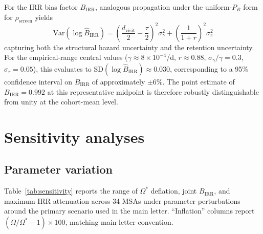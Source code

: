 \documentclass[11pt]{article}
\begin{document}
For the IRR bias factor $B_{\mathrm{IRR}}$, analogous propagation under the uniform-$P_R$ form for $\rho_{\mathrm{screen}}$ yields
\begin{equation}
\mathrm{Var}(\log \widehat{B}_{\mathrm{IRR}}) = \left(\frac{d_{\mathrm{visit}}}{2} - \frac{\tau}{2}\right)^2 \sigma_\gamma^2 + \left(\frac{1}{1+r}\right)^2 \sigma_r^2
\end{equation}
capturing both the structural hazard uncertainty and the retention uncertainty. For the empirical-range central values ($\gamma \approx 8\times10^{-4}$/d, $r \approx 0.88$, $\sigma_\gamma/\gamma = 0.3$, $\sigma_r = 0.05$), this evaluates to $\mathrm{SD}(\log \widehat{B}_{\mathrm{IRR}}) \approx 0.030$, corresponding to a 95\% confidence interval on $B_{\mathrm{IRR}}$ of approximately $\pm 6\%$. The point estimate of $B_{\mathrm{IRR}} = 0.992$ at this representative midpoint is therefore robustly distinguishable from unity at the cohort-mean level.

\section{Sensitivity analyses}

\subsection{Parameter variation}

Table~\ref{tab:sensitivity} reports the range of $\Omega^*$ deflation, joint $B_{\mathrm{IRR}}$, and maximum IRR attenuation across 34 MSAs under parameter perturbations around the primary scenario used in the main letter. ``Inflation'' columns report $(\Omega/\Omega^* - 1) \times 100$, matching main-letter convention.
\end{document}
